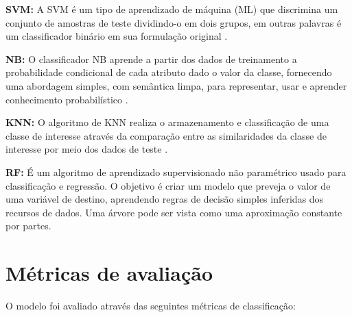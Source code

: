 \documentclass[a4paper]{ifacconf}
\begin{document}

\textbf{SVM:} A SVM é um tipo de aprendizado de máquina (ML) que discrimina um conjunto de amostras de teste dividindo-o em dois grupos, em outras palavras é um classificador binário em sua formulação original \citep{Oliveira2011}.

\textbf{NB:} O classificador NB aprende a partir dos dados de treinamento a probabilidade condicional de cada atributo dado o valor da classe, fornecendo uma abordagem simples, com semântica limpa, para representar, usar e aprender conhecimento probabilístico \citep{SantosLazeraWanke2014}.

\textbf{KNN:}  O algoritmo de KNN realiza o armazenamento e classificação de uma classe de interesse através da comparação entre as similaridades da classe de interesse por meio dos dados de teste \citep{Buani2009}. 

\textbf{RF:} É um algoritmo de aprendizado supervisionado não paramétrico usado para classificação e regressão. O objetivo é criar um modelo que preveja o valor de uma variável de destino, aprendendo regras de decisão simples inferidas dos recursos de dados. Uma árvore pode ser vista como uma aproximação constante por partes.

\section{Métricas de avaliação}
O modelo foi avaliado através das seguintes métricas de classificação:
\end{document}
